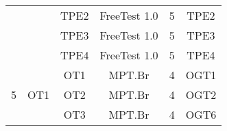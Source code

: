 \begin{table}[H]
{\begin{tabular}{|c|c|c|c|c|c|}
                                                                                        &                      & TPE2        & FreeTest 1.0    & 5                                                                                   & TPE2                                                                      \\ \cline{3-6} 
                                                                                        &                      & TPE3        & FreeTest 1.0    & 5                                                                                   & TPE3                                                                      \\ \cline{3-6} 
                                                                                        &                      & TPE4        & FreeTest 1.0    & 5                                                                                   & TPE4                                                                      \\ \hline
\multirow{3}{*}{5}                                                                      & \multirow{3}{*}{OT1} & OT1         & MPT.Br          & 4                                                                                   & OGT1                                                                      \\ \cline{3-6} 
                                                                                        &                      & OT2         & MPT.Br          & 4                                                                                   & OGT2                                                                      \\ \cline{3-6} 
                                                                                        &                      & OT3         & MPT.Br          & 4                                                                                   & OGT6                                                                      \\ \hline
\end{tabular}
}
\end{table}

